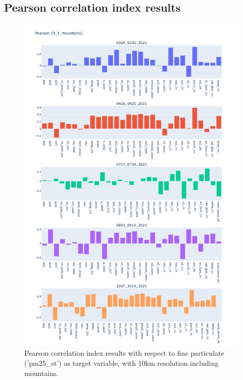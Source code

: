 \subsection{Pearson correlation index results}
\begin{figure}[H]
    \centering
    \includegraphics[scale=0.35]{images/tests/0_1_mountainspm25_st_pearson.png}
    \caption{Pearson correlation index results with respect to fine particulate ('pm25\_st') as target variable, with 10km resolution including mountains.}
    \label{fig:overview}
\end{figure}
